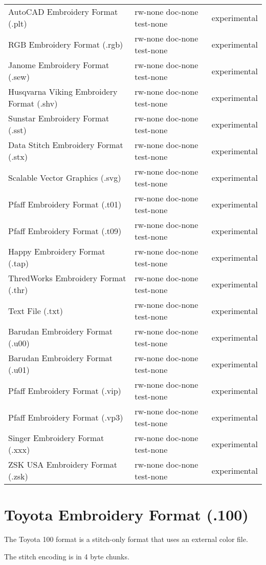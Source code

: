 \begin{longtable}{l l l}
AutoCAD Embroidery Format (.plt) & rw-none doc-none test-none & experimental \\
RGB Embroidery Format (.rgb) & rw-none doc-none test-none & experimental \\
Janome Embroidery Format (.sew) & rw-none doc-none test-none & experimental \\
Husqvarna Viking Embroidery Format (.shv) & rw-none doc-none test-none & experimental \\
Sunstar Embroidery Format (.sst) & rw-none doc-none test-none & experimental \\
Data Stitch Embroidery Format (.stx) & rw-none doc-none test-none & experimental \\
Scalable Vector Graphics (.svg) & rw-none doc-none test-none & experimental \\
Pfaff Embroidery Format (.t01) & rw-none doc-none test-none & experimental \\
Pfaff Embroidery Format (.t09) & rw-none doc-none test-none & experimental \\
Happy Embroidery Format (.tap) & rw-none doc-none test-none & experimental \\
ThredWorks Embroidery Format (.thr) & rw-none doc-none test-none & experimental \\
Text File (.txt) & rw-none doc-none test-none & experimental \\
Barudan Embroidery Format (.u00) & rw-none doc-none test-none & experimental \\
Barudan Embroidery Format (.u01) & rw-none doc-none test-none & experimental \\
Pfaff Embroidery Format (.vip) & rw-none doc-none test-none & experimental \\
Pfaff Embroidery Format (.vp3) & rw-none doc-none test-none & experimental \\
Singer Embroidery Format (.xxx) & rw-none doc-none test-none & experimental \\
ZSK USA Embroidery Format (.zsk) & rw-none doc-none test-none & experimental 
\end{longtable}

\section{Toyota Embroidery Format (.100)}

The Toyota 100 format is a stitch-only format that uses an external color file.

The stitch encoding is in 4 byte chunks.

